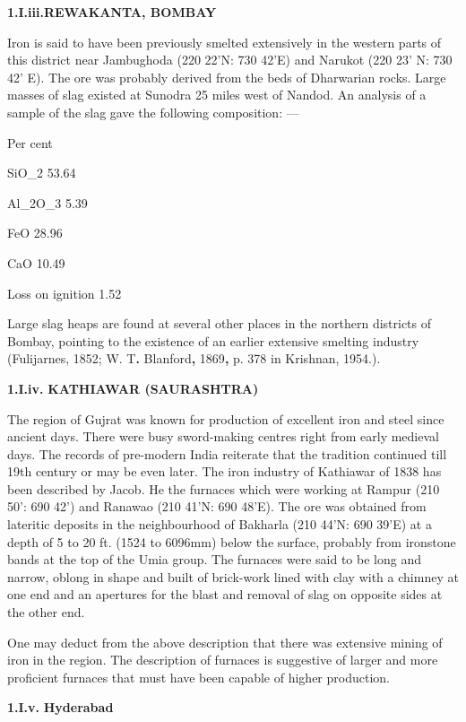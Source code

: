 \textbf{1.I.iii.}\textbf{REWAKANTA, BOMBAY}

Iron is said to have been previously smelted extensively in the western parts of this district near Jambughoda (220 22'N: 730 42'E) and Narukot (220 23' N: 730 42' E). The ore was probably derived from the beds of Dharwarian rocks. Large masses of slag existed at Sunodra 25 miles west of Nandod. An analysis of a sample of the slag gave the following composition: —

Per cent

SiO_2 53.64

Al_2O_3 5.39

FeO 28.96

CaO 10.49

Loss on ignition 1.52

Large slag heaps are found at several other places in the northern districts of Bombay, pointing to the existence of an earlier extensive smelting industry (Fulijarnes, 1852; W. T\textbf{. }Blanford\textbf{, }1869\textbf{, }p. 378 in Krishnan, 1954.).

\textbf{1.I.iv.}\textbf{ KATHIAWAR (SAURASHTRA)}

The region of Gujrat was known for production of excellent iron and steel since ancient days. There were busy sword-making centres right from early medieval days. The records of pre-modern India reiterate that the tradition continued till 19th century or may be even later. The iron industry of Kathiawar of 1838 has been described by Jacob. He the furnaces which were working at Rampur (210 50': 690 42') and Ranawao (210 41'N: 690 48'E). The ore was obtained from lateritic deposits in the neighbourhood of Bakharla (210 44'N: 690 39'E) at a depth of 5 to 20 ft. (1524 to 6096mm) below the surface, probably from ironstone bands at the top of the Umia group. The furnaces were said to be long and narrow, oblong in shape and built of brick-work lined with clay with a chimney at one end and an apertures for the blast and removal of slag on opposite sides at the other end.

One may deduct from the above description that there was extensive mining of iron in the region. The description of furnaces is suggestive of larger and more proficient furnaces that must have been capable of higher production.

\textbf{1.I.v.}\textbf{ Hyderabad}

